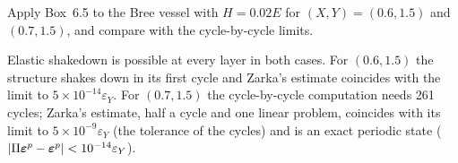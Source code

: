\label{exo:cy-zarka}
%
Apply Box~6.5 to the Bree vessel with $H=0.02E$ for $(X,Y)=(0.6,1.5)$ and
$(0.7,1.5)$, and compare with the cycle-by-cycle limits.
\begin{solution}
Elastic shakedown is possible at every layer in both cases. For $(0.6,1.5)$ the
structure shakes down in its first cycle and Zarka's estimate coincides with
the limit to $5\times10^{-14}\varepsilon_Y$. For $(0.7,1.5)$ the cycle-by-cycle
computation needs 261 cycles; Zarka's estimate, half a cycle and one linear
problem, coincides with its limit to $5\times10^{-9}\varepsilon_Y$ (the
tolerance of the cycles) and is an exact periodic state
($\lvert \Pi\bm{\varepsilon}^{p}-\bm{\varepsilon}^{p}\rvert<10^{-14}\varepsilon_Y$).

\end{solution}

